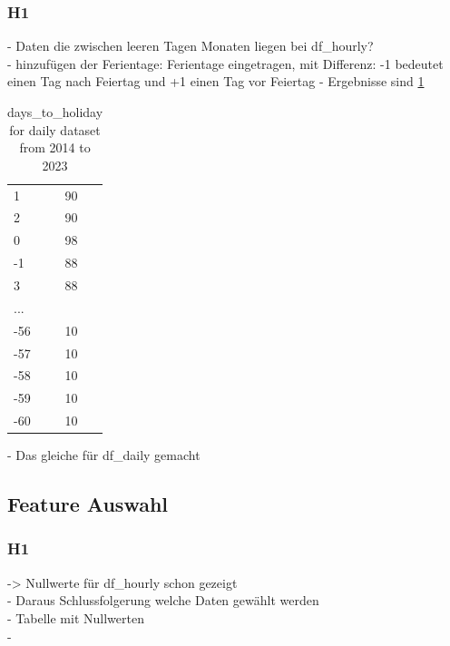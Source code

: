 \documentclass[12pt]{report}
\begin{document}
	\subsubsection{H1}
	- Daten die zwischen leeren Tagen Monaten liegen bei df\_hourly?\\
	- hinzufügen der Ferientage: Ferientage eingetragen, mit Differenz: -1 bedeutet einen Tag nach Feiertag und +1 einen Tag vor Feiertag
	- Ergebnisse sind \ref{tab:differenz-zu-feiertagen}
	\begin {table} [ht]%
	\label{tab:differenz-zu-feiertagen} 
	\centering
	\begin{tabular}{|l|l|}
		\hline
		1    & 90\\
		2    & 90\\
		0    & 98\\
		-1    & 88\\
		3    & 88\\
		... & ~ \\
		-56    & 10 \\
		-57     & 10\\
		-58     & 10\\
		-59     & 10\\
		-60     & 10 \\  
		\hline
	\end{tabular}
	\caption {days\_to\_holiday for daily dataset from 2014 to 2023} %
	\end {table}
	- Das gleiche für df\_daily gemacht
	\subsection{Feature Auswahl}
	\subsubsection{H1}
	-> Nullwerte für df\_hourly schon gezeigt\\
	
	- Daraus Schlussfolgerung welche Daten gewählt werden\\
	- Tabelle mit Nullwerten\\	
	- 
\end{document}
